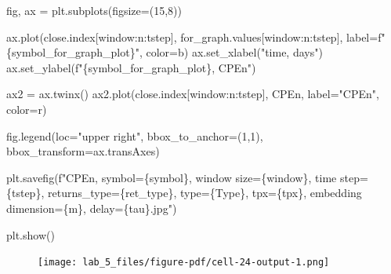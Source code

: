 \documentclass[
  letterpaper,
]{report}
\newenvironment{Shaded}{\begin{snugshade}}{\end{snugshade}}
\newcommand{\DecValTok}[1]{\textcolor[rgb]{0.68,0.00,0.00}{#1}}
\newcommand{\NormalTok}[1]{\textcolor[rgb]{0.00,0.23,0.31}{#1}}
\newcommand{\OperatorTok}[1]{\textcolor[rgb]{0.37,0.37,0.37}{#1}}
\newcommand{\SpecialCharTok}[1]{\textcolor[rgb]{0.37,0.37,0.37}{#1}}
\newcommand{\SpecialStringTok}[1]{\textcolor[rgb]{0.13,0.47,0.30}{#1}}
\newcommand{\StringTok}[1]{\textcolor[rgb]{0.13,0.47,0.30}{#1}}
\begin{document}
\begin{Shaded}
\begin{Highlighting}[]
\NormalTok{fig, ax }\OperatorTok{=}\NormalTok{ plt.subplots(figsize}\OperatorTok{=}\NormalTok{(}\DecValTok{15}\NormalTok{,}\DecValTok{8}\NormalTok{))}

\NormalTok{ax.plot(close.index[window:n:tstep], for\_graph.values[window:n:tstep], label}\OperatorTok{=}\SpecialStringTok{f"}\SpecialCharTok{\{}\NormalTok{symbol\_for\_graph\_plot}\SpecialCharTok{\}}\SpecialStringTok{"}\NormalTok{, color}\OperatorTok{=}\StringTok{\textquotesingle{}b\textquotesingle{}}\NormalTok{)}
\NormalTok{ax.set\_xlabel(}\StringTok{"time, days"}\NormalTok{)}
\NormalTok{ax.set\_ylabel(}\SpecialStringTok{f"}\SpecialCharTok{\{}\NormalTok{symbol\_for\_graph\_plot}\SpecialCharTok{\}}\SpecialStringTok{, CPEn"}\NormalTok{)}

\NormalTok{ax2 }\OperatorTok{=}\NormalTok{ ax.twinx()}
\NormalTok{ax2.plot(close.index[window:n:tstep], CPEn, label}\OperatorTok{=}\StringTok{"CPEn"}\NormalTok{, color}\OperatorTok{=}\StringTok{\textquotesingle{}r\textquotesingle{}}\NormalTok{)}

\NormalTok{fig.legend(loc}\OperatorTok{=}\StringTok{"upper right"}\NormalTok{, bbox\_to\_anchor}\OperatorTok{=}\NormalTok{(}\DecValTok{1}\NormalTok{,}\DecValTok{1}\NormalTok{), bbox\_transform}\OperatorTok{=}\NormalTok{ax.transAxes)}

\NormalTok{plt.savefig(}\SpecialStringTok{f"CPEn, symbol=}\SpecialCharTok{\{}\NormalTok{symbol}\SpecialCharTok{\}}\SpecialStringTok{, window size=}\SpecialCharTok{\{}\NormalTok{window}\SpecialCharTok{\}}\SpecialStringTok{, time step=}\SpecialCharTok{\{}\NormalTok{tstep}\SpecialCharTok{\}}\SpecialStringTok{, returns\_type=}\SpecialCharTok{\{}\NormalTok{ret\_type}\SpecialCharTok{\}}\SpecialStringTok{, type=}\SpecialCharTok{\{}\NormalTok{Type}\SpecialCharTok{\}}\SpecialStringTok{, tpx=}\SpecialCharTok{\{}\NormalTok{tpx}\SpecialCharTok{\}}\SpecialStringTok{, embedding dimension=}\SpecialCharTok{\{}\NormalTok{m}\SpecialCharTok{\}}\SpecialStringTok{, delay=}\SpecialCharTok{\{}\NormalTok{tau}\SpecialCharTok{\}}\SpecialStringTok{.jpg"}\NormalTok{)}

\NormalTok{plt.show()}
\end{Highlighting}
\end{Shaded}

\begin{figure}[H]

{\centering \texttt{[image: lab\_5\_files/figure-pdf/cell-24-output-1.png]}

}

\end{figure}
\end{document}
